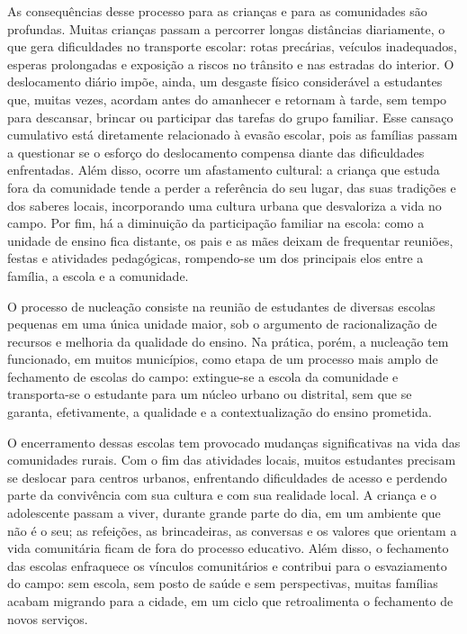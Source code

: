 \documentclass[
  12pt,
  openright,
  twoside,
  a4paper,
  english,
  brazilian,
  sumario=tradicional
]{abntex2}
\begin{document}
As consequências desse processo para as crianças e para as comunidades são profundas. Muitas crianças passam a percorrer longas distâncias diariamente, o que gera dificuldades no transporte escolar: rotas precárias, veículos inadequados, esperas prolongadas e exposição a riscos no trânsito e nas estradas do interior. O deslocamento diário impõe, ainda, um desgaste físico considerável a estudantes que, muitas vezes, acordam antes do amanhecer e retornam à tarde, sem tempo para descansar, brincar ou participar das tarefas do grupo familiar. Esse cansaço cumulativo está diretamente relacionado à evasão escolar, pois as famílias passam a questionar se o esforço do deslocamento compensa diante das dificuldades enfrentadas. Além disso, ocorre um afastamento cultural: a criança que estuda fora da comunidade tende a perder a referência do seu lugar, das suas tradições e dos saberes locais, incorporando uma cultura urbana que desvaloriza a vida no campo. Por fim, há a diminuição da participação familiar na escola: como a unidade de ensino fica distante, os pais e as mães deixam de frequentar reuniões, festas e atividades pedagógicas, rompendo-se um dos principais elos entre a família, a escola e a comunidade.

O processo de nucleação consiste na reunião de estudantes de diversas escolas pequenas em uma única unidade maior, sob o argumento de racionalização de recursos e melhoria da qualidade do ensino. Na prática, porém, a nucleação tem funcionado, em muitos municípios, como etapa de um processo mais amplo de fechamento de escolas do campo: extingue-se a escola da comunidade e transporta-se o estudante para um núcleo urbano ou distrital, sem que se garanta, efetivamente, a qualidade e a contextualização do ensino prometida.

O encerramento dessas escolas tem provocado mudanças significativas na vida das comunidades rurais. Com o fim das atividades locais, muitos estudantes precisam se deslocar para centros urbanos, enfrentando dificuldades de acesso e perdendo parte da convivência com sua cultura e com sua realidade local. A criança e o adolescente passam a viver, durante grande parte do dia, em um ambiente que não é o seu; as refeições, as brincadeiras, as conversas e os valores que orientam a vida comunitária ficam de fora do processo educativo. Além disso, o fechamento das escolas enfraquece os vínculos comunitários e contribui para o esvaziamento do campo: sem escola, sem posto de saúde e sem perspectivas, muitas famílias acabam migrando para a cidade, em um ciclo que retroalimenta o fechamento de novos serviços.
\end{document}
